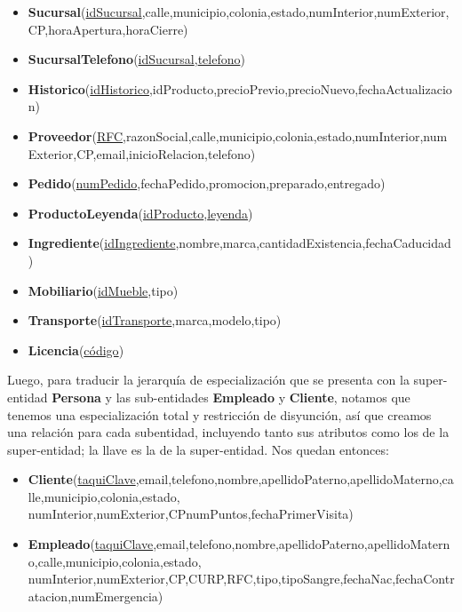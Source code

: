 \documentclass[11pt,letterpaper]{article}
\begin{document}
\begin{itemize}
\item {\footnotesize \textbf{Sucursal}(\underline{idSucursal},calle,municipio,colonia,estado,numInterior,numExterior,CP,horaApertura,horaCierre)}
\item \footnotesize{\textbf{SucursalTelefono}(\underline{idSucursal},\underline{telefono})}
\item \footnotesize{\textbf{Historico}(\underline{idHistorico},idProducto,precioPrevio,precioNuevo,fechaActualizacion)}
\item \scriptsize{\textbf{Proveedor}(\underline{RFC},razonSocial,calle,municipio,colonia,estado,numInterior,numExterior,CP,email,inicioRelacion,telefono)}
\item \footnotesize{\textbf{Pedido}(\underline{numPedido},fechaPedido,promocion,preparado,entregado)}
\item \footnotesize{\textbf{ProductoLeyenda}(\underline{idProducto},\underline{leyenda})}
\item \footnotesize{\textbf{Ingrediente}(\underline{idIngrediente},nombre,marca,cantidadExistencia,fechaCaducidad)}
\item \footnotesize{\textbf{Mobiliario}(\underline{idMueble},tipo)}
\item \footnotesize{\textbf{Transporte}(\underline{idTransporte},marca,modelo,tipo)}
\item \footnotesize{\textbf{Licencia}(\underline{código})}
\end{itemize}

Luego, para traducir la jerarquía de especialización que se presenta con la super-entidad \textbf{Persona} y las sub-entidades \textbf{Empleado} y \textbf{Cliente}, notamos que tenemos una especialización total y restricción de disyunción, así que creamos una relación para cada subentidad, incluyendo tanto sus atributos como los de la super-entidad; la llave es la de la super-entidad. Nos quedan entonces:

\begin{itemize}
\item \footnotesize{\textbf{Cliente}(\underline{taquiClave},email,telefono,nombre,apellidoPaterno,apellidoMaterno,calle,municipio,colonia,estado,
numInterior,numExterior,CPnumPuntos,fechaPrimerVisita)}
\item \footnotesize{\textbf{Empleado}(\underline{taquiClave},email,telefono,nombre,apellidoPaterno,apellidoMaterno,calle,municipio,colonia,estado,
numInterior,numExterior,CP,CURP,RFC,tipo,tipoSangre,fechaNac,fechaContratacion,numEmergencia)}
\end{itemize}
\end{document}
